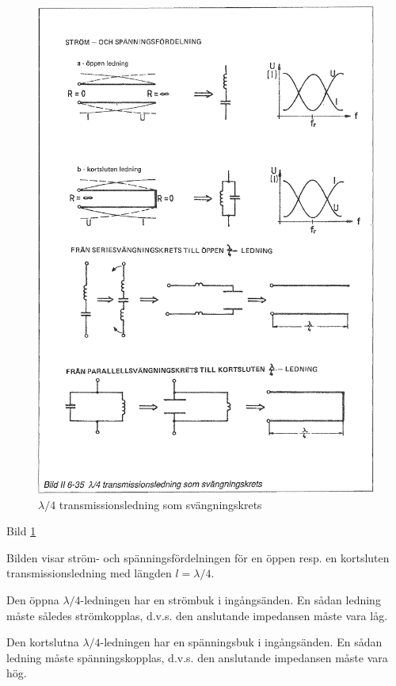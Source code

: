 \begin{figure}
  \includegraphics[width=\textwidth]{images/bild_2_6-35}
  \caption{\(\lambda/4\) transmissionsledning som svängningskrets}
  \label{fig:bildII6-35}
\end{figure}

Bild \ref{fig:bildII6-35}

Bilden visar ström- och spänningsfördelningen för en öppen resp. en
kortsluten transmissionsledning med längden \(l = \lambda/4\).

Den öppna \(\lambda/4\)-ledningen har en strömbuk i ingångsänden. En
sådan ledning måste således strömkopplas, d.v.s. den anslutande
impedansen måste vara låg.

Den kortslutna \(\lambda/4\)-ledningen har en spänningsbuk i
ingångsänden. En sådan ledning måste spänningskopplas, d.v.s. den
anslutande impedansen måste vara hög.


